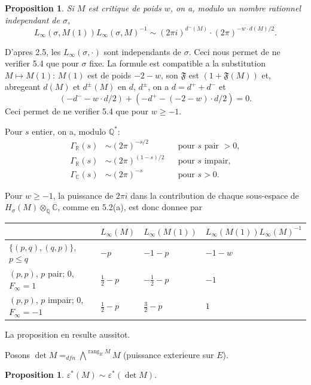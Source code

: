 \documentclass[12pt,a4paper]{article}
\theoremstyle{plain}
\newtheorem{proposition}[theorem]{Proposition}
\theoremstyle{definition}
\theoremstyle{remark}
\DeclareMathOperator{\rank}{rang}
\newcommand{\Q}{\mathbb{Q}}
\newcommand{\R}{\mathbb{R}}
\newcommand{\C}{\mathbb{C}}
\begin{document}
\begin{proposition}\label{prop:5.4}
Si $M$ est critique de poids $w$, on a, modulo un nombre rationnel independant de $\sigma$,
\[
L_\infty(\sigma, M(1)) L_\infty(\sigma, M)^{-1} \sim (2\pi i)^{d^-(M)} \cdot (2\pi)^{-w \cdot d(M)/2}.
\]
\end{proposition}

D'apres 2.5, les $L_\infty(\sigma, \cdot)$ sont independants de $\sigma$. Ceci nous permet de ne
verifier 5.4 que pour $\sigma$ fixe. La formule est compatible a la substitution
$M \mapsto M(1)$: $M(1)$ est de poids $-2-w$, son $\mathfrak{F}$ est $(1+\mathfrak{F}(M))$ et, abregeant
$d(M)$ et $d^\pm(M)$ en $d$, $d^\pm$, on a $d = d^+ + d^-$ et
\[
(-d^- - w \cdot d/2) + (-d^+ - (-2-w) \cdot d/2) = 0.
\]
Ceci permet de ne verifier 5.4 que pour $w \geq -1$.

Pour $s$ entier, on a, modulo $\Q^*$:
\begin{equation}\label{eq:5.4.1}
\begin{aligned}
\Gamma_\R(s) &\sim (2\pi)^{-s/2} &&\text{pour $s$ pair } > 0,\\
\Gamma_\R(s) &\sim (2\pi)^{(1-s)/2} &&\text{pour $s$ impair},\\
\Gamma_\C(s) &\sim (2\pi)^{-s} &&\text{pour $s > 0$.}
\end{aligned}
\end{equation}

Pour $w \geq -1$, la puissance de $2\pi i$ dans la contribution de chaque sous-espace de
$H_\sigma(M) \otimes_\Q \C$, comme en 5.2(a), est donc donnee par

\begin{center}
\begin{tabular}{llll}
\toprule
& $L_\infty(M)$ & $L_\infty(M(1))$ & $L_\infty(M(1)) L_\infty(M)^{-1}$ \\
\midrule
$\{(p,q), (q,p)\}$, $p \leq q$ & $-p$ & $-1-p$ & $-1-w$ \\
$(p,p)$, $p$ pair; $0$, $F_\infty = 1$ & $\tfrac{1}{2}-p$ & $-\tfrac{1}{2}-p$ & $-1$ \\
$(p,p)$, $p$ impair; $0$, $F_\infty = -1$ & $\tfrac{1}{2}-p$ & $\tfrac{3}{2}-p$ & $1$ \\
\bottomrule
\end{tabular}
\end{center}
La proposition en resulte aussitot.

Posons $\det M =_{dfn} \bigwedge^{\rank_E M} M$ (puissance exterieure sur $E$).

\begin{proposition}\label{prop:5.5}
$\varepsilon^*(M) \sim \varepsilon^*(\det M)$.
\end{proposition}
\end{document}
